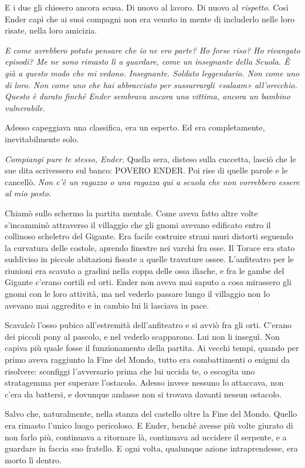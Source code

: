 {E i due gli chiesero ancora scusa. Di nuovo al lavoro. Di nuovo al
	\emph{rispetto.} Così Ender capì che ai suoi compagni non era venuto in
	mente di includerlo nelle loro risate, nella loro amicizia.}

\emph{{E come avrebbero potuto pensare che io ne ero parte? Ho forse
		riso? Ho rivangato episodi? Me ne sono rimasto lì a guardare, come un
		insegnante della Scuola. È già a questo modo che mi vedono. Insegnante.
		Soldato leggendario. Non come uno di loro. Non come uno che hai
		abbracciato per sussurrargli «salaam» all'orecchio. Questo è durato
		finché Ender sembrava ancora una vittima, ancora un bambino
		vulnerabile.}}

{Adesso capeggiava una classifica, era un esperto. Ed era completamente,
	inevitabilmente solo.}

\emph{{Compiangi pure te stesso, Ender. }}{Quella sera, disteso sulla
	cuccetta, lasciò che le sue dita scrivessero sul banco: POVERO ENDER.
	Poi rise di quelle parole e le cancellò. \emph{Non c'è un ragazzo o una
		ragazza qui a scuola che non vorrebbero essere al mio posto.}}

{Chiamò sullo schermo la partita mentale. Come aveva fatto altre volte
	s'incamminò attraverso il villaggio che gli gnomi avevano edificato
	entro il collinoso scheletro del Gigante. Era facile costruire strani
	muri distorti seguendo la curvatura delle costole, aprendo finestre nei
	varchi fra esse. Il Torace era stato suddiviso in piccole abitazioni
	fissate a quelle travature ossee. L'anfiteatro per le riunioni era
	scavato a gradini nella coppa delle ossa iliache, e fra le gambe del
	Gigante c'erano cortili ed orti. Ender non aveva mai saputo a cosa
	mirassero gli gnomi con le loro attività, ma nel vederlo passare lungo
	il villaggio non lo avevano mai aggredito e in cambio lui li lasciava in
	pace.}

{Scavalcò l'osso pubico all'estremità dell'anfiteatro e si avviò fra gli
	orti. C'erano dei piccoli pony al pascolo, e nel vederlo scapparono. Lui
	non li inseguì. Non capiva più quale fosse il funzionamento della
	partita. Ai vecchi tempi, quando per primo aveva raggiunto la Fine del
	Mondo, tutto era combattimenti o enigmi da risolvere: sconfiggi
	l'avversario prima che lui uccida te, o escogita uno stratagemma per
	superare l'ostacolo. Adesso invece nessuno lo attaccava, non c'era da
	battersi, e dovunque andasse non si trovava davanti nessun ostacolo.}

{Salvo che, naturalmente, nella stanza del castello oltre la Fine del
	Mondo. Quello era rimasto l'unico luogo pericoloso. E Ender, benché
	avesse più volte giurato di non farlo più, continuava a ritornare là,
	continuava ad uccidere il serpente, e a guardare in faccia suo fratello.
	E ogni volta, qualunque azione intraprendesse, era morto lì dentro.}

